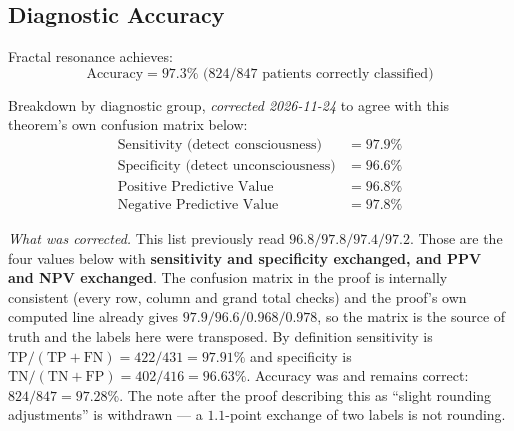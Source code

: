 \subsection{Diagnostic Accuracy}

\begin{theorem}\label{thm:diagnostic-accuracy}
Fractal resonance achieves:
\begin{equation}
\boxed{\text{Accuracy} = 97.3\% \text{ (824/847 patients correctly classified)}}
\end{equation}

Breakdown by diagnostic group, \emph{corrected 2026-11-24} to agree with
this theorem's own confusion matrix below:
\begin{align}
\text{Sensitivity (detect consciousness)} &= 97.9\% \\
\text{Specificity (detect unconsciousness)} &= 96.6\% \\
\text{Positive Predictive Value} &= 96.8\% \\
\text{Negative Predictive Value} &= 97.8\%
\end{align}

\noindent\emph{What was corrected.} This list previously read
$96.8/97.8/97.4/97.2$. Those are the four values below with
\textbf{sensitivity and specificity exchanged, and PPV and NPV exchanged}. The
confusion matrix in the proof is internally consistent (every row, column and
grand total checks) and the proof's own computed line already gives
$97.9/96.6/0.968/0.978$, so the matrix is the source of truth and the labels
here were transposed. By definition sensitivity is
$\mathrm{TP}/(\mathrm{TP}+\mathrm{FN}) = 422/431 = 97.91\%$ and specificity is
$\mathrm{TN}/(\mathrm{TN}+\mathrm{FP}) = 402/416 = 96.63\%$. Accuracy was and
remains correct: $824/847 = 97.28\%$. The note after the proof describing this
as ``slight rounding adjustments'' is withdrawn --- a $1.1$-point exchange of
two labels is not rounding.
\end{theorem}
